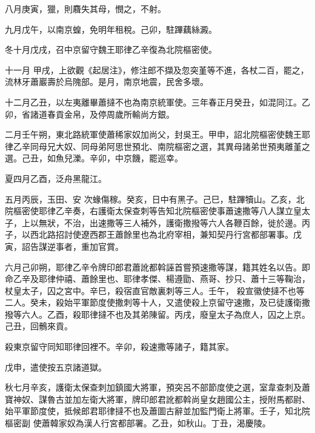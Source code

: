 \begin{pinyinscope}
 八月庚寅，獵，則麛失其母，憫之，不射。



 九月戊午，以南京蝗，免明年租稅。己卯，駐蹕藕絲澱。



 冬十月戊戌，召中京留守魏王耶律乙辛復為北院樞密使。



 十一月
 甲戌，上欲觀《起居注》，修注郎不擷及忽突堇等不進，各杖二百，罷之，流林牙蕭巖壽於烏隗部。是月，南京地震，民舍多壞。



 十二月乙丑，以左夷離畢蕭撻不也為南京統軍使。三年春正月癸丑，如混同江。乙卯，省諸道春貢金帛，及停周歲所輸尚方銀。



 二月壬午朔，東北路統軍使蕭稀家奴加尚父，封吳王。甲申，詔北院樞密使魏王耶律乙辛同母兄大奴、同母弟阿思世預北、南院樞密之選，其異母諸弟世預夷離堇之選。己丑，如魚兒濼。辛卯，中京饑，罷巡幸。



 夏四月乙酉，泛舟黑龍江。



 五月丙辰，玉田、安
 次蝝傷稼。癸亥，日中有黑子。己巳，駐蹕犢山。乙亥，北院樞密使耶律乙辛奏，右護衛太保查刺等告知北院樞密使事蕭速撒等八人謀立皇太子，上以無狀，不治，出速撒等三人補外，護衛撒撥等六人各鞭百餘，徙於邊。丙子，以西北路招討使遼西郡王蕭餘里也為北府宰相，兼知契丹行宮都部署事。戊寅，詔告謀逆事者，重加官賞。



 六月己卯朔，耶律乙辛令牌印郎君蕭訛都斡誣首嘗預速撒等謀，籍其姓名以告。即命乙辛及耶律仲禧、蕭餘里也、耶律孝傑、楊遵勖、燕哥、抄只、蕭十三等鞠治，杖皇太子，囚之宮中。辛巳，殺宿直官敵裏刺等三人。壬午，
 殺宣徽使撻不也等二人。癸未，殺始平軍節度使撒刺等十人，又遣使殺上京留守速撒，及已徒護衛撒撥等六人。乙酉，殺耶律撻不也及其弟陳留。丙戌，廢皇太子為庶人，囚之上京。己丑，回鶻來貢。



 殺東京留守同知耶律回裡不。辛卯，殺速撒等諸子，籍其家。



 戊申，遣使按五京諸道獄。



 秋七月辛亥，護衛太保查刺加鎮國大將軍，預突呂不部節度使之選，室韋查刺及蕭寶神奴、謀魯古並加左衛大將軍，牌印郎君訛都斡尚皇女趙國公主，授附馬都尉、始平軍節度使，抵候郎君耶律撻不也及蕭圖古辭並加監門衛上將軍。壬子，知北院樞密副
 使蕭韓家奴為漢人行宮都部署。乙丑，如秋山。丁丑，渴慶陵。




\end{pinyinscope}
